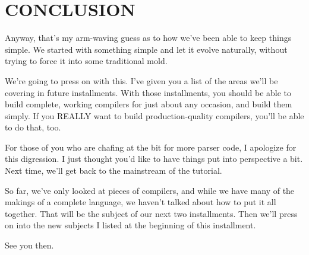 \section{CONCLUSION}

Anyway, that's my arm-waving  guess  as to how we've been able to keep things simple. We started with something simple and  let it evolve  naturally, without  trying  to   force   it   into  some traditional mold.

We're going to  press on with this. I've given you a list of the areas  we'll  be  covering in future installments. With  those installments, you  should  be  able  to  build  complete, working compilers for just about any occasion, and build them simply. If you REALLY want to build production-quality compilers, you'll be able to do that, too.

For those of you who are chafing at the bit for more parser code, I apologize for this digression. I just thought  you'd  like  to have things put  into  perspective  a  bit. Next time, we'll get back to the mainstream of the tutorial.

So far, we've only looked at pieces of compilers, and  while  we have  many  of  the  makings  of a complete language, we  haven't talked about how to put  it  all  together. That  will  be the subject of our next  two  installments. Then we'll press on into the new subjects I listed at the beginning of this installment.

See you then.
